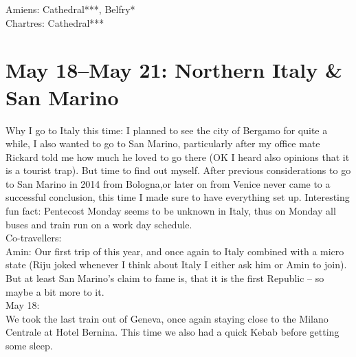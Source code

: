 Amiens: Cathedral***, Belfry*\\
Chartres: Cathedral***

\section{May 18--May 21: Northern Italy \& San Marino}
\label{2018:Italy}

Why I go to Italy this time: I planned to see the city of Bergamo for quite a while, I also wanted to go to San Marino, particularly after my office mate Rickard told me how much he loved to go there (OK I heard also opinions that it is a tourist trap). But time to find out myself. After previous considerations to go to San Marino in 2014 from Bologna,or later on from Venice never came to a successful conclusion, this time I made sure to have everything set up. Interesting fun fact: Pentecost Monday seems to be unknown in Italy, thus on Monday all buses and train run on a work day schedule.\\

Co-travellers:\\
Amin: Our first trip of this year, and once again to Italy combined with a micro state (Riju joked whenever I think about Italy I either ask him or Amin to join). But at least San Marino's claim to fame is, that it is the first Republic -- so maybe a bit more to it.\\

May 18:\\
We took the last train out of Geneva, once again staying close to the Milano Centrale at Hotel Bernina. This time we also had a quick Kebab before getting some sleep.\\

